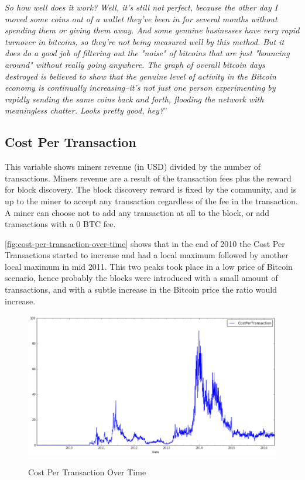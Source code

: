 \textit{ So how well does it work? Well, it's still not perfect,
  because the other day I moved some coins out of a wallet they've
  been in for several months without spending them or giving them
  away. And some genuine businesses have very rapid turnover in
  bitcoins, so they're not being measured well by this method. But it
  does do a good job of filtering out the "noise" of bitcoins that are
  just "bouncing around" without really going anywhere. The graph of
  overall bitcoin days destroyed is believed to show that the genuine
  level of activity in the Bitcoin economy is continually
  increasing--it's not just one person experimenting by rapidly
  sending the same coins back and forth, flooding the network with
  meaningless chatter. Looks pretty good, hey?}''

\clearpage

\subsection{Cost Per Transaction}
\label{sec:cost-per-transaction}

This variable shows miners revenue (in USD) divided by the number of
transactions. Miners revenue are a result of the transaction fees plus
the reward for block discovery. The block discovery reward is fixed by
the community, and is up to the miner to accept any transaction
regardless of the fee in the transaction. A miner can choose not to
add any transaction at all to the block, or add transactions with a
$0$ BTC fee.

\autoref{fig:cost-per-transaction-over-time} shows that in the end of
2010 the Cost Per Transactions started to increase and had a local
maximum followed by another local maximum in mid 2011. This two peaks
took place in a low price of Bitcoin scenario, hence probably the
blocks were introduced with a small amount of transactions, and with a
subtle increase in the Bitcoin price the ratio would increase.

\begin{figure}[bth]
  \myfloatalign
  {\includegraphics[width=1\linewidth]
    {gfx/cost-per-transaction-over-time}}
  \caption{Cost Per Transaction Over Time}
  \label{fig:cost-per-transaction-over-time}
\end{figure}

